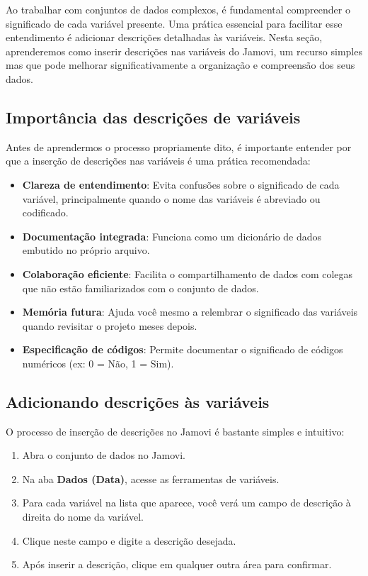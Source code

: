 Ao trabalhar com conjuntos de dados complexos, é fundamental compreender o significado de cada variável presente. Uma prática essencial para facilitar esse entendimento é adicionar descrições detalhadas às variáveis. Nesta seção, aprenderemos como inserir descrições nas variáveis do Jamovi, um recurso simples mas que pode melhorar significativamente a organização e compreensão dos seus dados.

\subsection{Importância das descrições de variáveis}

Antes de aprendermos o processo propriamente dito, é importante entender por que a inserção de descrições nas variáveis é uma prática recomendada:

\begin{itemize}
    \item \textbf{Clareza de entendimento}: Evita confusões sobre o significado de cada variável, principalmente quando o nome das variáveis é abreviado ou codificado.
    \item \textbf{Documentação integrada}: Funciona como um dicionário de dados embutido no próprio arquivo.
    \item \textbf{Colaboração eficiente}: Facilita o compartilhamento de dados com colegas que não estão familiarizados com o conjunto de dados.
    \item \textbf{Memória futura}: Ajuda você mesmo a relembrar o significado das variáveis quando revisitar o projeto meses depois.
    \item \textbf{Especificação de códigos}: Permite documentar o significado de códigos numéricos (ex: 0 = Não, 1 = Sim).
\end{itemize}

\subsection{Adicionando descrições às variáveis}

O processo de inserção de descrições no Jamovi é bastante simples e intuitivo:

\begin{enumerate}
    \item Abra o conjunto de dados no Jamovi.
    \item Na aba \textbf{Dados (Data)}, acesse as ferramentas de variáveis.
    \item Para cada variável na lista que aparece, você verá um campo de descrição à direita do nome da variável.
    \item Clique neste campo e digite a descrição desejada.
    \item Após inserir a descrição, clique em qualquer outra área para confirmar.
\end{enumerate}

